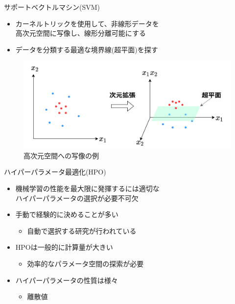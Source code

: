 \documentclass[12pt, cjk, dvipdfmx]{beamer}
\begin{document}
\begin{frame}
\begin{columns}[t]
\begin{column}{0.490\linewidth}
\begin{mybox}{サポートベクトルマシン(SVM)}
\begin{itemize}
        
                  \item カーネルトリックを使用して、非線形データを\\高次元空間に写像し、線形分離可能にする 
                  \item データを分類する最適な境界線(超平面)を探す                
                \end{itemize}
                \begin{figure}
                  \centering
                  \includegraphics[width=0.9\linewidth]{syazou.png}
                  \caption{高次元空間への写像の例}
                 \end{figure}
            \end{mybox}
            \begin{mybox}{ハイパーパラメータ最適化(HPO)}
              \begin{itemize}
                \item 機械学習の性能を最大限に発揮するには適切な\\ハイパーパラメータの選択が必要不可欠
                \item 手動で経験的に決めることが多い
                \begin{itemize}
                  \item 自動で選択する研究が行われている
                \end{itemize}
                \item HPOは一般的に計算量が大きい
                \begin{itemize}
                  \item 効率的なパラメータ空間の探索が必要
                \end{itemize}
                \item ハイパーパラメータの性質は様々
                \begin{itemize}
                  \item 離散値

\end{itemize}
\end{itemize}
\end{mybox}
\end{column}
\end{columns}
\end{frame}
\end{document}
